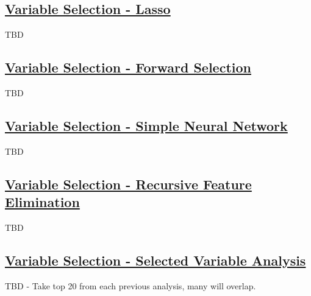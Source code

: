 \subsection{\hyperref[appendix:electricity:l]{Variable Selection - Lasso}}
TBD

\subsection{\hyperref[appendix:electricity:lp]{Variable Selection - Forward Selection}}
TBD

\subsection{\hyperref[appendix:electricity:snn]{Variable Selection - Simple Neural Network}}
TBD

\subsection{\hyperref[appendix:electricity:rfe]{Variable Selection - Recursive Feature Elimination}}
TBD

\subsection{\hyperref[appendix:electricity:sv]{Variable Selection - Selected Variable Analysis}}
TBD - Take top 20 from each previous analysis, many will overlap.
